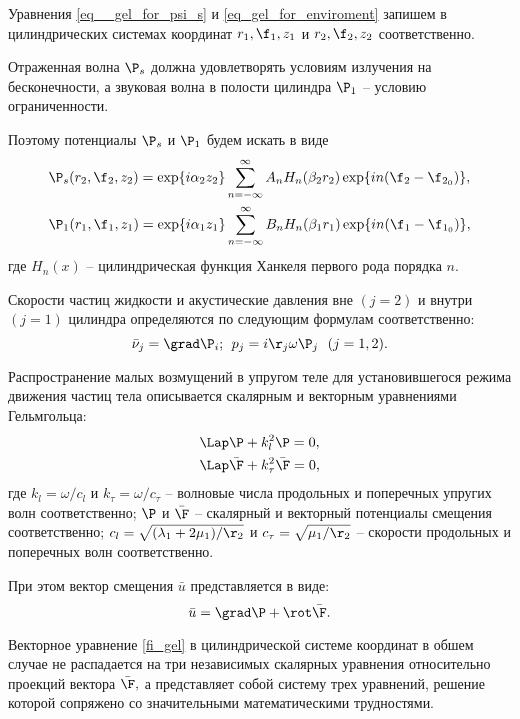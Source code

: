 Уравнения \eqref{eq__gel_for_psi_s} и \eqref{eq_gel_for_enviroment} запишем в цилиндрических системах координат $r_1, \f_1, z_1$ и $r_2, \f_2, z_2$ соответственно. 

Отраженная волна $\P_s$ должна удовлетворять условиям излучения на бесконечности, а звуковая волна в полости цилиндра $\P_1$ -- условию ограниченности.

Поэтому потенциалы $\P_s$ и $\P_1$ будем искать в виде
\begin{align}
&\P_s(r_2, \f_2, z_2)= \exp\{i\alpha_2 z_2\}\sum_{n=-\infty}^{\infty}A_nH_n(\beta_2 r_2)\exp\{in(\f_2-\f_{2_0})\},\\
&\P_1(r_1, \f_1, z_1)= \exp\{i\alpha_1 z_1\}\sum_{n=-\infty}^{\infty}B_nH_n(\beta_1 r_1)\exp\{in(\f_1-\f_{1_0})\},
\end{align}
где $H_n(x)$ -- цилиндрическая функция Ханкеля первого рода порядка $n.$

Скорости частиц жидкости и акустические давления вне $(j=2)$ и внутри $(j=1)$ цилиндра определяются по следующим формулам соответственно:
\begin{equation}
\bar{\nu}_j=\grad\P_i;\:\:p_j=i\r_j\omega\P_j\:\:\:(j=1,2).
\end{equation}

Распространение малых возмущений в упругом теле для установившегося режима движения частиц тела описывается скалярным и векторным уравнениями Гельмгольца:
\begin{align}
&\Lap\P+k_l^2\P=0,\\
&\Lap\bar{\F}+k_{\tau}^2\bar{\F}=0,\label{fi_gel}
\end{align}
где $k_l=\omega/c_l$ и $k_{\tau}=\omega/c_{\tau}$ -- волновые числа продольных и поперечных упругих волн соответственно; $\P$ и $\bar\F$ -- скалярный и векторный потенциалы смещения соответственно; $c_l=\sqrt{(\lambda_1+2\mu_1)/\r_2}$ и $c_{\tau}=\sqrt{\mu_1/\r_2}$ -- скорости продольных и поперечных волн соответственно.

При этом вектор смещения $\bar{u}$ представляется в виде:
\begin{equation}
\bar{u}=\grad\P+\rot\bar{\F}.
\end{equation}

Векторное уравнение \eqref{fi_gel} в цилиндрической системе координат в обшем случае не распадается на три независимых скалярных уравнения относительно проекций вектора $\bar{\F},$ а представляет собой систему трех уравнений, решение которой сопряжено со значительными математическими трудностями.

